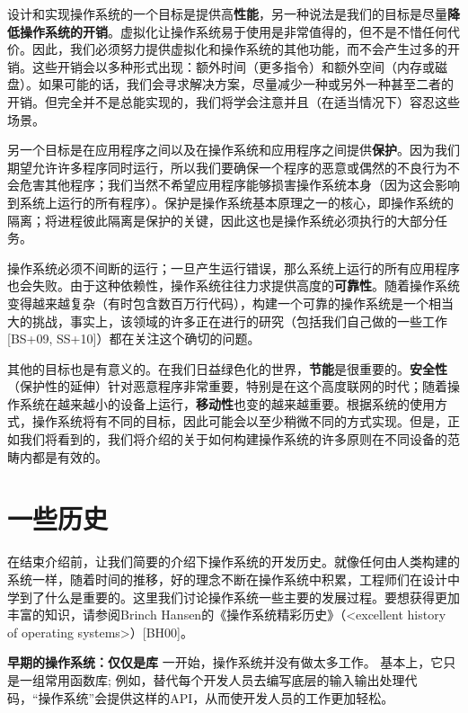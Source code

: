 设计和实现操作系统的一个目标是提供高\textbf{性能}，另一种说法是我们的目标是尽量\textbf{降低操作系统的开销}。虚拟化让操作系统易于使用是非常值得的，但不是不惜任何代价。因此，我们必须努力提供虚拟化和操作系统的其他功能，而不会产生过多的开销。这些开销会以多种形式出现：额外时间（更多指令）和额外空间（内存或磁盘）。如果可能的话，我们会寻求解决方案，尽量减少一种或另外一种甚至二者的开销。但完全并不是总能实现的，我们将学会注意并且（在适当情况下）容忍这些场景。

另一个目标是在应用程序之间以及在操作系统和应用程序之间提供\textbf{保护}。因为我们期望允许许多程序同时运行，所以我们要确保一个程序的恶意或偶然的不良行为不会危害其他程序；我们当然不希望应用程序能够损害操作系统本身（因为这会影响到系统上运行的所有程序）。保护是操作系统基本原理之一的核心，即操作系统的隔离；将进程彼此隔离是保护的关键，因此这也是操作系统必须执行的大部分任务。

操作系统必须不间断的运行；一旦产生运行错误，那么系统上运行的所有应用程序也会失败。由于这种依赖性，操作系统往往力求提供高度的\textbf{可靠性}。随着操作系统变得越来越复杂（有时包含数百万行代码），构建一个可靠的操作系统是一个相当大的挑战，事实上，该领域的许多正在进行的研究（包括我们自己做的一些工作[BS+09, SS+10]）都在关注这个确切的问题。

其他的目标也是有意义的。在我们日益绿色化的世界，\textbf{节能}是很重要的。\textbf{安全性}（保护性的延伸）针对恶意程序非常重要，特别是在这个高度联网的时代；随着操作系统在越来越小的设备上运行，\textbf{移动性}也变的越来越重要。根据系统的使用方式，操作系统将有不同的目标，因此可能会以至少稍微不同的方式实现。但是，正如我们将看到的，我们将介绍的关于如何构建操作系统的许多原则在不同设备的范畴内都是有效的。

\section{一些历史}
在结束介绍前，让我们简要的介绍下操作系统的开发历史。就像任何由人类构建的系统一样，随着时间的推移，好的理念不断在操作系统中积累，工程师们在设计中学到了什么是重要的。这里我们讨论操作系统一些主要的发展过程。要想获得更加丰富的知识，请参阅Brinch Hansen的《操作系统精彩历史》（<excellent history of operating systems>）[BH00]。

\textbf{早期的操作系统：仅仅是库}
一开始，操作系统并没有做太多工作。 基本上，它只是一组常用函数库; 例如，替代每个开发人员去编写底层的输入输出处理代码，“操作系统”会提供这样的API，从而使开发人员的工作更加轻松。

